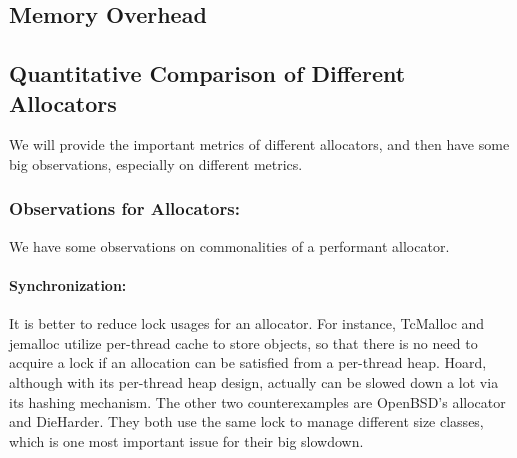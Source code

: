 \subsection{Memory Overhead}
\label{sec:memory}

\subsection{Quantitative Comparison of Different Allocators}

We will provide the important metrics of different allocators, and then have some big observations, especially on different metrics.


\subsubsection{Observations for Allocators:} 

We have some observations on commonalities of a performant allocator. 

\paragraph{Synchronization:} It is better to reduce lock usages for an allocator. For instance, TcMalloc and jemalloc utilize per-thread cache to store objects, so that there is no need to acquire a lock if an allocation can be satisfied from a per-thread heap. Hoard, although with its per-thread heap design, actually can be slowed down a lot via its hashing mechanism. The other two counterexamples are OpenBSD's allocator and DieHarder. They both use the same lock to manage different size classes, which is one most important issue for their big slowdown. 

